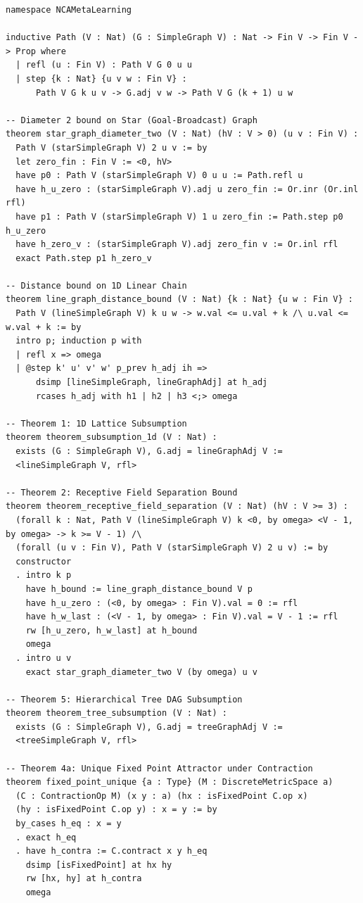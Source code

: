 \documentclass[10pt,twocolumn,letterpaper]{article}
\begin{document}
\begin{lstlisting}
namespace NCAMetaLearning

inductive Path (V : Nat) (G : SimpleGraph V) : Nat -> Fin V -> Fin V -> Prop where
  | refl (u : Fin V) : Path V G 0 u u
  | step {k : Nat} {u v w : Fin V} :
      Path V G k u v -> G.adj v w -> Path V G (k + 1) u w

-- Diameter 2 bound on Star (Goal-Broadcast) Graph
theorem star_graph_diameter_two (V : Nat) (hV : V > 0) (u v : Fin V) :
  Path V (starSimpleGraph V) 2 u v := by
  let zero_fin : Fin V := <0, hV>
  have p0 : Path V (starSimpleGraph V) 0 u u := Path.refl u
  have h_u_zero : (starSimpleGraph V).adj u zero_fin := Or.inr (Or.inl rfl)
  have p1 : Path V (starSimpleGraph V) 1 u zero_fin := Path.step p0 h_u_zero
  have h_zero_v : (starSimpleGraph V).adj zero_fin v := Or.inl rfl
  exact Path.step p1 h_zero_v

-- Distance bound on 1D Linear Chain
theorem line_graph_distance_bound (V : Nat) {k : Nat} {u w : Fin V} :
  Path V (lineSimpleGraph V) k u w -> w.val <= u.val + k /\ u.val <= w.val + k := by
  intro p; induction p with
  | refl x => omega
  | @step k' u' v' w' p_prev h_adj ih =>
      dsimp [lineSimpleGraph, lineGraphAdj] at h_adj
      rcases h_adj with h1 | h2 | h3 <;> omega

-- Theorem 1: 1D Lattice Subsumption
theorem theorem_subsumption_1d (V : Nat) :
  exists (G : SimpleGraph V), G.adj = lineGraphAdj V :=
  <lineSimpleGraph V, rfl>

-- Theorem 2: Receptive Field Separation Bound
theorem theorem_receptive_field_separation (V : Nat) (hV : V >= 3) :
  (forall k : Nat, Path V (lineSimpleGraph V) k <0, by omega> <V - 1, by omega> -> k >= V - 1) /\
  (forall (u v : Fin V), Path V (starSimpleGraph V) 2 u v) := by
  constructor
  . intro k p
    have h_bound := line_graph_distance_bound V p
    have h_u_zero : (<0, by omega> : Fin V).val = 0 := rfl
    have h_w_last : (<V - 1, by omega> : Fin V).val = V - 1 := rfl
    rw [h_u_zero, h_w_last] at h_bound
    omega
  . intro u v
    exact star_graph_diameter_two V (by omega) u v

-- Theorem 5: Hierarchical Tree DAG Subsumption
theorem theorem_tree_subsumption (V : Nat) :
  exists (G : SimpleGraph V), G.adj = treeGraphAdj V :=
  <treeSimpleGraph V, rfl>

-- Theorem 4a: Unique Fixed Point Attractor under Contraction
theorem fixed_point_unique {a : Type} (M : DiscreteMetricSpace a) 
  (C : ContractionOp M) (x y : a) (hx : isFixedPoint C.op x) 
  (hy : isFixedPoint C.op y) : x = y := by
  by_cases h_eq : x = y
  . exact h_eq
  . have h_contra := C.contract x y h_eq
    dsimp [isFixedPoint] at hx hy
    rw [hx, hy] at h_contra
    omega


\end{lstlisting}
\end{document}
